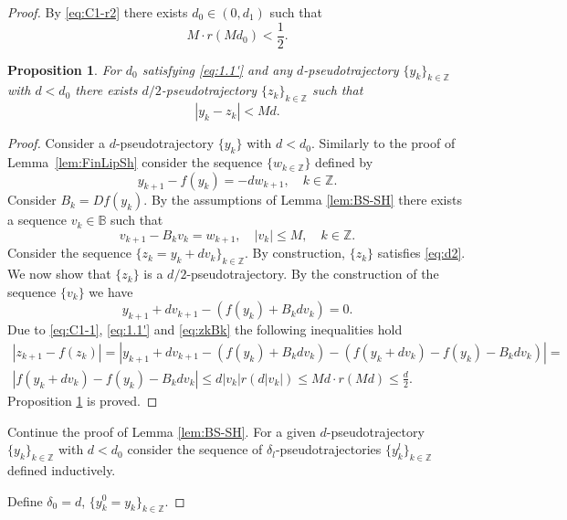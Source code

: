 \documentclass[12pt]{article}
\newcommand{\Bb}{\mathbb{B}}
\newcommand{\Zz}{\mathbb{Z}}
\newtheorem{statement}[thm]{Proposition}
\theoremstyle{definition}
\begin{document}
\begin{proof}
    By \eqref{eq:C1-r2} there exists $d_0 \in (0, d_1)$ such that
\begin{equation}\label{eq:1.1'}
    M\cdot r(Md_0) < \frac{1}{2}.
\end{equation}
\begin{statement}\label{stat:d2}
    For $d_0$ satisfying \eqref{eq:1.1'} and any $d$-pseudotrajectory $\{y_k\}_{k \in \Zz}$ with $d<d_0$ there exists $d/2$-pseudotrajectory $\{z_k\}_{k \in \Zz}$ such that
    \begin{equation}\label{eq:d2}
    |y_k-z_k| < Md.
    \end{equation}
\end{statement}
\begin{proof}
    Consider a $d$-pseudotrajectory $\{y_k\}$ with $d < d_0$. Similarly to the proof of Lemma~\ref{lem:FinLipSh} consider the sequence $\{w_{k \in \Zz}\}$ defined by
\begin{equation}\label{eq:defw}
    y_{k+1}-f(y_k) = -dw_{k+1}, \quad k \in \Zz.
\end{equation}
    Consider $B_k = Df(y_k)$. By the assumptions of Lemma \ref{lem:BS-SH} there exists a sequence $v_k \in \Bb$ such that
    $$
    v_{k+1} - B_kv_k = w_{k+1}, \quad |v_k| \leq M, \quad k \in \Zz.
    $$
 Consider the sequence $\{z_k = y_k + dv_k\}_{k \in \Zz}$. By construction, $\{z_k\}$ satisfies \eqref{eq:d2}. We now show that $\{z_k\}$ is a $d/2$-pseudotrajectory. By the construction of the sequence $\{v_k\}$ we have
    \begin{equation}\label{eq:zkBk}
        y_{k+1} + dv_{k+1} - (f(y_k) + B_kdv_k) = 0.
    \end{equation}
     Due to \eqref{eq:C1-1}, \eqref{eq:1.1'} and \eqref{eq:zkBk} the following inequalities hold
\begin{multline*}
|z_{k+1} - f(z_k)| = |y_{k+1} + dv_{k+1} - (f(y_k)+B_kdv_k) - (f(y_k+dv_k) - f(y_k) -B_kdv_k)|  = \\
|f(y_k+dv_k) - f(y_k) -B_kdv_k| \leq d|v_k|r(d|v_k|) \leq Md \cdot r(Md) \leq \frac{d}{2}.
\end{multline*}
Proposition \ref{stat:d2} is proved.
\end{proof}

Continue the proof of Lemma \ref{lem:BS-SH}.
For a given $d$-pseudotrajectory $\{y_k\}_{k \in \Zz}$ with $d< d_0$ consider the sequence of $\delta_l$-pseudotrajectories $\{y_k^l\}_{k \in \Zz}$ defined inductively.

Define $\delta_0 = d$, $\{y_k^0 = y_k\}_{k \in \Zz}$.


\end{proof}
\end{document}
